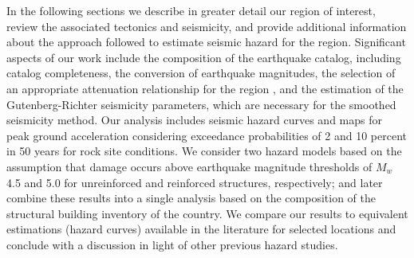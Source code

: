 In the following sections we describe in greater detail our region of interest, review the associated tectonics and seismicity, and provide additional information about the approach followed to estimate seismic hazard for the region. Significant aspects of our work include the composition of the earthquake catalog, including catalog completeness, the conversion of earthquake magnitudes, the selection of an appropriate attenuation relationship for the region \citep{Zafarani2014, Kalkan2004}, and the estimation of the Gutenberg-Richter seismicity parameters, which are necessary for the smoothed seismicity method. Our analysis includes seismic hazard curves and maps for peak ground acceleration considering exceedance probabilities of 2 and 10 percent in 50 years for rock site conditions. We consider two hazard models based on the assumption that damage occurs above earthquake magnitude thresholds of $M_w$ 4.5 and 5.0 for unreinforced and reinforced structures, respectively; and later combine these results into a single analysis based on the composition of the structural building inventory of the country. We compare our results to equivalent estimations (hazard curves) available in the literature for selected locations and conclude with a discussion in light of other previous hazard studies.








